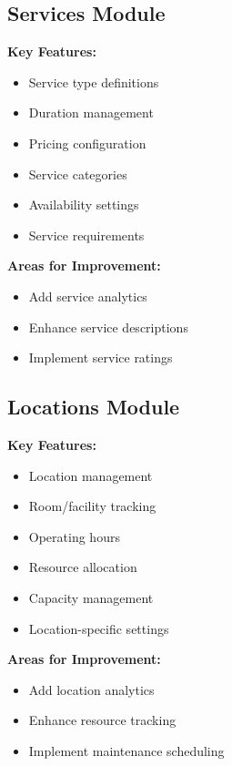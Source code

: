 \subsection{Services Module}
\begin{tcolorbox}[
    enhanced,
    title={Services Module: 90\% Complete},
    attach boxed title to top left,
    boxed title style={
        colback=success!50,
        colframe=success!50,
        arc=0mm,
    },
    colback=white,
    colframe=success!50,
    arc=0mm,
    fonttitle=\bfseries
]
    \textbf{Key Features:}
    \begin{itemize}
        \item Service type definitions
        \item Duration management
        \item Pricing configuration
        \item Service categories
        \item Availability settings
        \item Service requirements
    \end{itemize}
    
    \textbf{Areas for Improvement:}
    \begin{itemize}
        \item Add service analytics
        \item Enhance service descriptions
        \item Implement service ratings
    \end{itemize}
\end{tcolorbox}

\subsection{Locations Module}
\begin{tcolorbox}[
    enhanced,
    title={Locations Module: 85\% Complete},
    attach boxed title to top left,
    boxed title style={
        colback=success!50,
        colframe=success!50,
        arc=0mm,
    },
    colback=white,
    colframe=success!50,
    arc=0mm,
    fonttitle=\bfseries
]
    \textbf{Key Features:}
    \begin{itemize}
        \item Location management
        \item Room/facility tracking
        \item Operating hours
        \item Resource allocation
        \item Capacity management
        \item Location-specific settings
    \end{itemize}
    
    \textbf{Areas for Improvement:}
    \begin{itemize}
        \item Add location analytics
        \item Enhance resource tracking
        \item Implement maintenance scheduling
    \end{itemize}
\end{tcolorbox}

